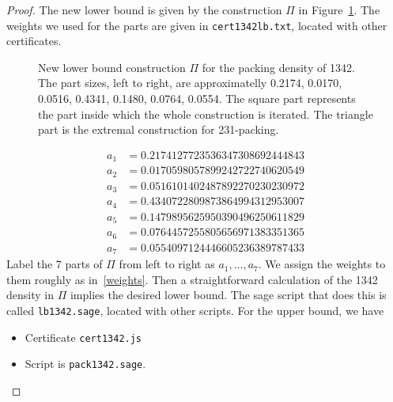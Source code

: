 \documentclass[12pt, a4paper, twoside]{report}
\begin{document}
\begin{proof}
The new lower bound is given by the construction $\Pi$ in Figure~\ref{fig:pack1342}. The weights we used for the parts are given in \texttt{cert1342lb.txt}, located with other certificates.
\begin{figure}[ht]
\centering
{}
\caption{\small New lower bound construction $\Pi$ for the packing density of 1342. The part sizes, left to right, are approximatelly 0.2174, 0.0170, 0.0516, 0.4341, 0.1480, 0.0764, 0.0554. The square part represents the part inside which the whole construction is iterated. The triangle part is the extremal construction for 231-packing.}
\label{fig:pack1342}
\end{figure}

\begin{equation}
\begin{aligned}
a_1 &= 0.2174127723536347308692444843\\
a_2 &= 0.0170598057899242722740620549\\
a_3 &= 0.0516101402487892270230230972\\
a_4 &= 0.4340722809873864994312953007\\
a_5 &= 0.1479895625950390496250611829\\
a_6 &= 0.0764457255805656971383351365\\
a_7 &= 0.0554097124446605236389787433
\label{weights}
\end{aligned}
\end{equation}
Label the 7 parts of $\Pi$ from left to right as $a_1,\ldots,a_7$. We assign the weights to them roughly as in~\eqref{weights}. Then a straightforward calculation of the 1342 density in $\Pi$ implies the desired lower bound. The sage script that does this is called \texttt{lb1342.sage}, located with other scripts. For the upper bound, we have
\begin{itemize}
\item Certificate \texttt{cert1342.js}
\item Script is \texttt{pack1342.sage}.
\end{itemize}
\end{proof}
\end{document}
